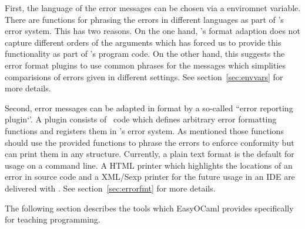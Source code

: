First, the language of the error messages can be chosen via a
enviromnet variable. There are functions for phrasing the errors in different
languages as part of \easyocaml's error system. This has two reasons. On the one
hand, \ocaml's format adaption does not capture different orders of the
arguments which has forced us to provide this functionality as part of
\easyocaml's program code. On the other hand, this suggests the error format
plugins to use common phrases for the messages which simplities comparisions of
errors given in different settings. See section~\ref{sec:envvars} for more
details.

Second, error messages can be adapted in format by a so-called ``error reporting
plugin`'. A plugin consists of \ocaml\ code which defines arbitrary error
formatting functions and registers them in \easyocaml's error system.
As mentioned those functions should use the provided functions to phrase the
errors to enforce conformity but can print them in any structure.
Currently, a plain text format is the default for usage on a command line.
A HTML printer which highlights the locations of an error in source code and a
XML/Sexp printer for the future usage in an IDE are delivered with \easyocaml.
See section~\ref{sec:errorfmt} for more details.

The following section describes the tools which EasyOCaml provides 
specifically for teaching programming.
